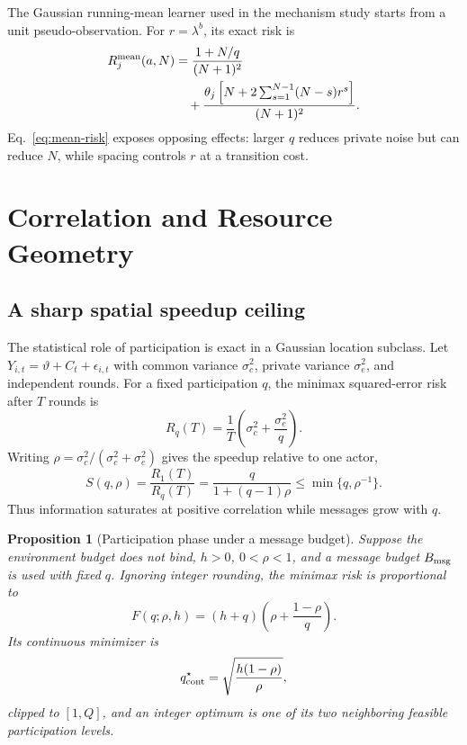 \documentclass[journal]{IEEEtran}
\newtheorem{proposition}{Proposition}
\begin{document}
The Gaussian running-mean learner used in the mechanism study starts from a unit pseudo-observation.
For $r=\lambda^b$, its exact risk is
\begin{align}
R_j^{\rm mean}(a,N)&=\frac{1+N/q}{(N+1)^2}\nonumber\\
&\quad+\frac{\theta_j\left[N+2\sum_{s=1}^{N-1}(N-s)r^s\right]}{(N+1)^2}.
\label{eq:mean-risk}
\end{align}
Eq.~\eqref{eq:mean-risk} exposes opposing effects: larger $q$ reduces private noise but can reduce $N$, while spacing controls $r$ at a transition cost.

\section{Correlation and Resource Geometry}
\subsection{A sharp spatial speedup ceiling}
The statistical role of participation is exact in a Gaussian location subclass.
Let $Y_{i,t}=\vartheta+C_t+\epsilon_{i,t}$ with common variance $\sigma_c^2$, private variance $\sigma_e^2$, and independent rounds.
For a fixed participation $q$, the minimax squared-error risk after $T$ rounds is
\begin{equation}
R_q(T)=\frac{1}{T}\left(\sigma_c^2+\frac{\sigma_e^2}{q}\right).
\label{eq:location-risk}
\end{equation}
Writing $\rho=\sigma_c^2/(\sigma_c^2+\sigma_e^2)$ gives the speedup relative to one actor,
\begin{equation}
S(q,\rho)=\frac{R_1(T)}{R_q(T)}
=\frac{q}{1+(q-1)\rho}
\le\min\{q,\rho^{-1}\}.
\label{eq:speedup}
\end{equation}
Thus information saturates at positive correlation while messages grow with $q$.

\begin{proposition}[Participation phase under a message budget]
Suppose the environment budget does not bind, $h>0$, $0<\rho<1$, and a message budget $B_{\rm msg}$ is used with fixed $q$.
Ignoring integer rounding, the minimax risk is proportional to
\begin{equation}
F(q;\rho,h)=(h+q)\left(\rho+\frac{1-\rho}{q}\right).
\label{eq:participation-phase-objective}
\end{equation}
Its continuous minimizer is
\begin{equation}
q_{\rm cont}^\star=\sqrt{\frac{h(1-\rho)}{\rho}},
\label{eq:participation-phase}
\end{equation}
clipped to $[1,Q]$, and an integer optimum is one of its two neighboring feasible participation levels.
\label{prop:q-phase}
\end{proposition}
\end{document}
